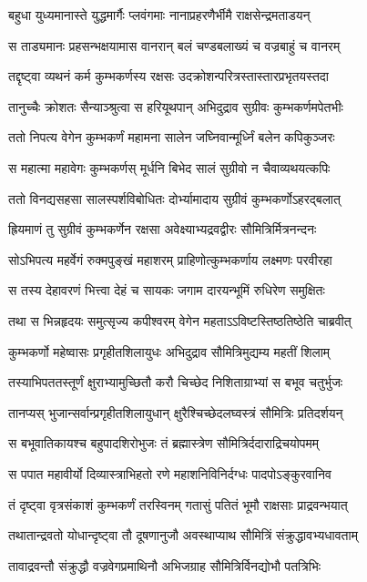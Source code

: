 \twolineshloka
{बहुधा युध्यमानास्ते युद्धमार्गैः प्लवंगमाः}
{नानाप्रहरणैर्भीमै राक्षसेन्द्रमताडयन्}


\twolineshloka
{स ताड्यमानः प्रहसन्भक्षयामास वानरान्}
{बलं चण्डबलाख्यं च वज्रबाहुं च वानरम्}


\twolineshloka
{तद्दृष्ट्वा व्यथनं कर्म कुम्भकर्णस्य रक्षसः}
{उदक्रोशन्परित्रस्तास्तारप्रभृतयस्तदा}


\twolineshloka
{तानुच्चैः क्रोशतः सैन्याञ्श्रुत्वा स हरियूथपान्}
{अभिदुद्राव सुग्रीवः कुम्भकर्णमपेतभीः}


\twolineshloka
{ततो निपत्य वेगेन कुम्भकर्णं महामना}
{सालेन जघ्निवान्मूर्ध्निं बलेन कपिकुञ्जरः}


\twolineshloka
{स महात्मा महावेगः कुम्भकर्णस् मूर्धनि}
{बिभेद सालं सुग्रीवो न चैवाव्यथयत्कपिः}


\twolineshloka
{ततो विनद्यसहसा सालस्पर्शविबोधितः}
{दोर्भ्यामादाय सुग्रीवं कुम्भकर्णोऽहरद्बलात्}


\twolineshloka
{ह्रियमाणं तु सुग्रीवं कुम्भकर्णेन रक्षसा}
{अवेक्ष्याभ्यद्रवद्वीरः सौमित्रिर्मित्रनन्दनः}


\twolineshloka
{सोऽभिपत्य महर्वेगं रुक्मपुङ्खं महाशरम्}
{प्राहिणोत्कुम्भकर्णाय लक्ष्मणः परवीरहा}


\twolineshloka
{स तस्य देहावरणं भित्त्वा देहं च सायकः}
{जगाम दारयन्भूमिं रुधिरेण समुक्षितः}


\twolineshloka
{तथा स भिन्नहृदयः समुत्सृज्य कपीश्वरम्}
{वेगेन महताऽऽविष्टस्तिष्ठतिष्ठेति चाब्रवीत्}


\twolineshloka
{कुम्भकर्णो महेष्वासः प्रगृहीतशिलायुधः}
{अभिदुद्राव सौमित्रिमुद्यम्य महतीं शिलाम्}


\twolineshloka
{तस्याभिपततस्तूर्णं क्षुराभ्यामुच्छितौ करौ}
{चिच्छेद निशिताग्राभ्यां स बभूव चतुर्भुजः}


\twolineshloka
{तानप्यस् भुजान्सर्वान्प्रगृहीतशिलायुधान्}
{क्षुरैश्चिच्छेदलघ्वस्त्रं सौमित्रिः प्रतिदर्शयन्}


\twolineshloka
{स बभूवातिकायश्च बहुपादशिरोभुजः}
{तं ब्रह्मास्त्रेण सौमित्रिर्ददाराद्रिचयोपमम्}


\twolineshloka
{स पपात महावीर्यो दिव्यास्त्राभिहतो रणे}
{महाशनिविनिर्दग्धः पादपोऽङ्कुरवानिव}


\twolineshloka
{तं दृष्ट्वा वृत्रसंकाशं कुम्भकर्णं तरस्विनम्}
{गतासुं पतितं भूमौ राक्षसाः प्राद्रवन्भयात्}


\twolineshloka
{तथातान्द्रवतो योधान्दृष्ट्वा तौ दूषणानुजौ}
{अवस्थाप्याथ सौमित्रिं संक्रुद्धावभ्यधावताम्}


\twolineshloka
{तावाद्रवन्तौ संक्रुद्धौ वज्रवेगप्रमाथिनौ}
{अभिजग्राह सौमित्रिर्विनद्योभौ पतत्रिभिः}


